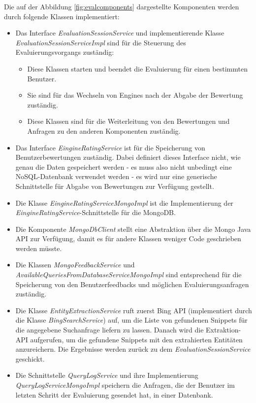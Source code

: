 Die auf der Abbildung \ref{fig:evalcomponents} dargestellte Komponenten werden durch folgende Klassen implementiert:
\begin{itemize}
\item Das Interface \textit{EvaluationSessionService} und implementierende Klasse \textit{EvaluationSessionServiceImpl} sind für die Steuerung des Evaluierungsvorgangs zuständig:
\begin{itemize}
\item Diese Klassen starten und beendet die Evaluierung für einen bestimmten Benutzer.
\item Sie sind für das Wechseln von Engines nach der Abgabe der Bewertung zuständig.
\item Diese Klassen sind für die Weiterleitung von den Bewertungen und Anfragen zu den anderen Komponenten zuständig.
\end{itemize}
\item Das Interface \textit{EingineRatingService} ist für die Speicherung von Benutzerbewertungen zuständig. Dabei definiert dieses Interface nicht, wie genau die Daten gespeichert werden - es muss also nicht unbedingt eine NoSQL-Datenbank verwendet werden - es wird nur eine generische Schnittstelle für Abgabe von Bewertungen zur Verfügung gestellt.
\item Die Klasse \textit{EingineRatingServiceMongoImpl} ist die Implementierung der \textit{EingineRatingService}-Schnittstelle für die MongoDB.
\item Die Komponente \textit{MongoDbClient} stellt eine Abstraktion über die Mongo Java API zur Verfügung, damit es für andere Klassen weniger Code geschrieben werden müsste.
\item Die Klassen \textit{MongoFeedbackService} und \textit{AvailableQueriesFromDatabaseServiceMongoImpl} sind entsprechend für die Speicherung von den Benutzerfeedbacks und möglichen Evaluierungsanfragen zuständig. 
\item Die Klasse \textit{EntityExtractionService} ruft zuerst Bing API (implementiert durch die Klasse \textit{BingSearchService}) auf, um die Liste von gefundenen Snippets für die angegebene Suchanfrage liefern zu lassen. Danach wird die Extraktion-API aufgerufen, um die gefundene Snippets mit den extrahierten Entitäten anzureichern. Die Ergebnisse werden zurück zu dem \textit{EvaluationSessionService} geschickt.
\item Die Schnittstelle \textit{QueryLogService} und ihre Implementierung \textit{QueryLogServiceMongoImpl} speichern die Anfragen, die der Benutzer im letzten Schritt der Evaluierung gesendet hat, in einer Datenbank.
\end{itemize}

